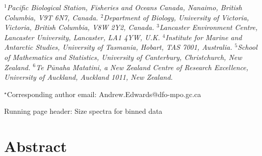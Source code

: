 

\vspace{7mm}


\medskip

{\it
\noindent $^1$Pacific Biological Station, Fisheries and Oceans Canada,
  Nanaimo, British Columbia, V9T 6N7, Canada. %
\noindent $^2$Department
  of Biology, University of Victoria, Victoria, British
  Columbia, V8W 2Y2, Canada. %
\noindent $^3$Lancaster Environment Centre, Lancaster University, Lancaster,
  LA1 4YW, U.K.
\noindent $^4$Institute for Marine and Antarctic Studies,
  University of Tasmania, Hobart, TAS 7001, Australia. %
\noindent $^5$School of Mathematics and Statistics, University of Canterbury,
  Christchurch, New Zealand.
\noindent $^6$Te P\={u}naha Matatini, a New Zealand Centre of
  Research Excellence, University of Auckland, Auckland 1011, New Zealand.}

\medskip

\noindent $^\star$Corresponding author email: Andrew.Edwards@dfo-mpo.gc.ca


\medskip

\medskip

\noindent Running page header: Size spectra for binned data %

\medskip

\section*{Abstract}

